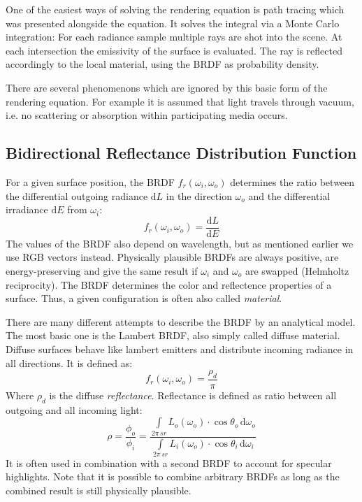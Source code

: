 \documentclass[thesis.tex]{subfiles}
\begin{document}
One of the easiest ways of solving the rendering equation is path tracing which was presented alongside the equation.
It solves the integral via a Monte Carlo integration:
For each radiance sample multiple rays are shot into the scene.
At each intersection the emissivity of the surface is evaluated. 
The ray is reflected accordingly to the local material, using the BRDF as probability density.

There are several phenomenons which are ignored by this basic form of the rendering equation.
For example it is assumed that light travels through vacuum, i.e. no scattering or absorption within participating media occurs.

\subsection{Bidirectional Reflectance Distribution Function}\label{sec:preq:brdf}
For a given surface position, the BRDF $f_r(\omega_i, \omega_o)$ determines the ratio between the differential outgoing radiance $\mathrm{d}L$ in the direction $\omega_o$ and the differential irradiance $\mathrm{d}E$ from $\omega_i$:
\begin{equation}
f_r(\omega_i, \omega_o) = \frac{\mathrm{d}L}{\mathrm{d}E}
\end{equation}
The values of the BRDF also depend on wavelength, but as mentioned earlier we use RGB vectors instead.
Physically plausible BRDFs are always positive, are energy-preserving and give the same result if $\omega_i$ and $\omega_o$ are swapped (Helmholtz reciprocity).
The BRDF determines the color and reflectence properties of a surface.
Thus, a given configuration is often also called \emph{material}.

There are many different attempts to describe the BRDF by an analytical model.
The most basic one is the Lambert BRDF, also simply called diffuse material.
Diffuse surfaces behave like lambert emitters and distribute incoming radiance in all directions.
It is defined as:
\begin{equation}
f_r(\omega_i, \omega_o) = \frac{\rho_d}{\pi}
\end{equation}
Where $\rho_d$ is the diffuse \emph{reflectance}.
Reflectance is defined as ratio between all outgoing and all incoming light:
\begin{equation}
\rho = \frac{\phi_o}{\phi_i} = \frac{\int\limits_{2\pi\,sr} L_o(\omega_o)\cdot \cos\theta_o  \, \mathrm{d}\omega_o}{\int\limits_{2\pi\,sr} L_i(\omega_o)\cdot \cos\theta_i  \, \mathrm{d}\omega_i}
\end{equation}
It is often used in combination with a second BRDF to account for specular highlights.
Note that it is possible to combine arbitrary BRDFs as long as the combined result is still physically plausible.
\end{document}
